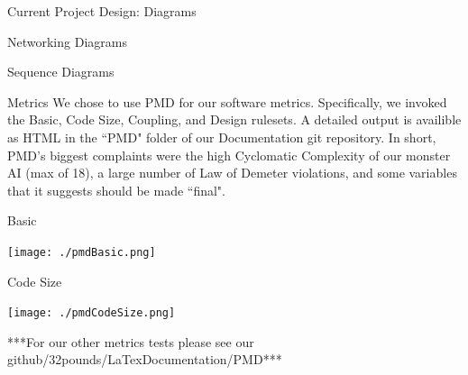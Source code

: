 \documentclass[12pt]{report}
\begin{document}
\begin{chapter}{Current Project Design: Diagrams}
\begin{section}{Networking Diagrams}
\begin{subsection}{Sequence Diagrams}
	\end{subsection}
   \end{section}
 \end{chapter}
 
  \begin{chapter}{Metrics}
  	We chose to use PMD for our software metrics. Specifically, we invoked the Basic, Code Size, Coupling, and Design rulesets. A detailed output is availible as HTML in the ``PMD" folder of our Documentation git repository. In short, PMD's biggest complaints were the high Cyclomatic Complexity of our monster AI (max of 18), a large number of Law of Demeter violations, and some variables that it suggests should be made ``final".
   \begin{section}{Basic}
   \centerline{\texttt{[image: ./pmdBasic.png]}}
   \end{section}
   \begin{section}{Code Size}
      \centerline{\texttt{[image: ./pmdCodeSize.png]}}

   \end{section}
   ***For our other metrics tests please see our github/32pounds/LaTexDocumentation/PMD***
  \end{chapter}
 
\end{document}
